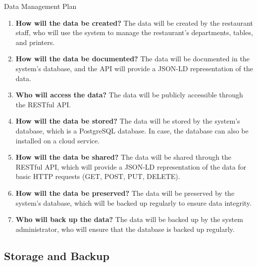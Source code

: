 \begin{frame}[allowframebreaks]{Data Management Plan}

	\begin{enumerate}\justifying
		\item \textbf{How will the data be \textcolor{UNITSCherry}{created}?} The data will be created by the
		      restaurant staff, who will use the system to manage the restaurant's
		      departments, tables, and printers.
		\item \textbf{How will the data be \textcolor{UNITSCherry}{documented}?} The data will be documented in
		      the system's database, and the API will provide a JSON-LD representation of
		      the data.
		\item \textbf{Who will \textcolor{UNITSCherry}{access} the data?} The data will be publicly accessible
		      through the RESTful API.
		\item \textbf{How will the data be \textcolor{UNITSCherry}{stored}?} The data will be stored by the
		      system's database, which is a PostgreSQL database. In case, the database
		      can also be installed on a cloud service.
		\item \textbf{How will the data be \textcolor{UNITSCherry}{shared}?} The data will be shared through the
		      RESTful API, which will provide a JSON-LD representation of the data for
		      basic HTTP requests (GET, POST, PUT, DELETE).
		\item \textbf{How will the data be \textcolor{UNITSCherry}{preserved}?} The data will be preserved by
		      the system's database, which will be backed up regularly to ensure data
		      integrity.
		\item \textbf{Who will \textcolor{UNITSCherry}{back up} the data?} The data will be backed up by the
		      system administrator, who will ensure that the database is backed up
		      regularly.
	\end{enumerate}
\end{frame}

\subsection{Storage and Backup}

